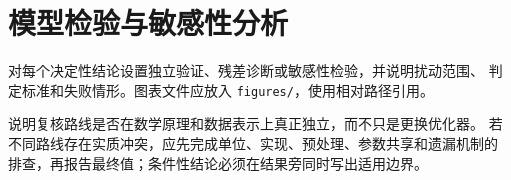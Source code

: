 \section{模型检验与敏感性分析}

对每个决定性结论设置独立验证、残差诊断或敏感性检验，并说明扰动范围、
判定标准和失败情形。图表文件应放入 \texttt{figures/}，使用相对路径引用。

说明复核路线是否在数学原理和数据表示上真正独立，而不只是更换优化器。
若不同路线存在实质冲突，应先完成单位、实现、预处理、参数共享和遗漏机制的
排查，再报告最终值；条件性结论必须在结果旁同时写出适用边界。
